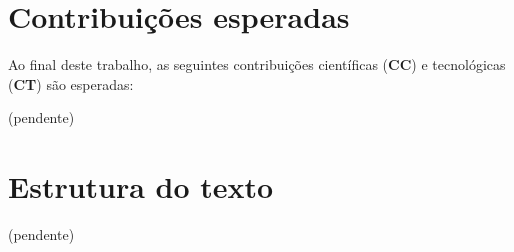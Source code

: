 \section{Contribuições esperadas}

Ao final deste trabalho, as seguintes contribuições científicas ({\bf CC}) e
tecnológicas ({\bf CT}) são esperadas:

(pendente)

%

\section{Estrutura do texto} 

(pendente)



